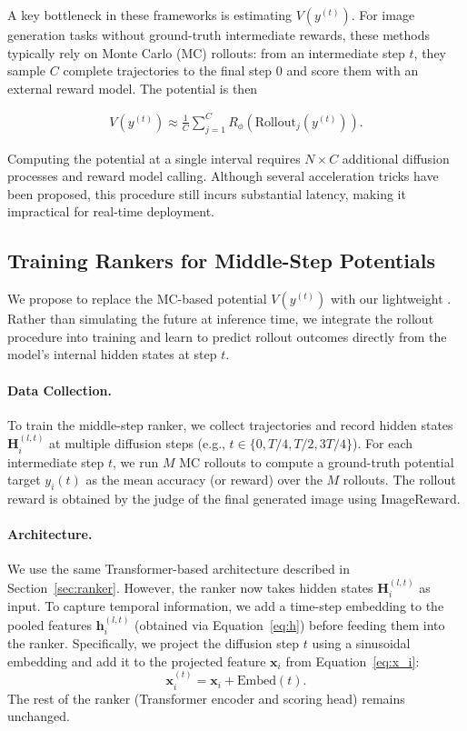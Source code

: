 \documentclass{article}
\newcommand{\method}{\text{Diffusion Ranker}\xspace}
\begin{document}
A key bottleneck in these frameworks is estimating $V(y^{(t)})$. For image generation tasks without ground-truth intermediate rewards, these methods typically rely on Monte Carlo (MC) rollouts: from an intermediate step $t$, they sample $C$ complete trajectories to the final step $0$ and score them with an external reward model. The potential is then

\begin{align}
    V(y^{(t)}) \approx \frac{1}{C} \sum_{j=1}^{C} R_{\phi}(\text{Rollout}_{j}(y^{(t)})).
    \label{eq:V}
\end{align}

Computing the potential at a single interval requires $N \times C$ additional diffusion processes and reward model calling. Although several acceleration tricks have been proposed, this procedure still incurs substantial latency, making it impractical for real-time deployment.

\subsection{Training Rankers for Middle-Step Potentials}

We propose to replace the MC-based potential $V(y^{(t)})$ with our lightweight \method. Rather than simulating the future at inference time, we integrate the rollout procedure into training and learn to predict rollout outcomes directly from the model's internal hidden states at step $t$.

\paragraph{Data Collection.}
To train the middle-step ranker, we collect trajectories and record hidden states $\mathbf{H}_i^{(l,t)}$ at multiple diffusion steps (e.g., $t \in \{0, T/4, T/2, 3T/4\}$). For each intermediate step $t$, we run $M$ MC rollouts to compute a ground-truth potential target $y_i(t)$ as the mean accuracy (or reward) over the $M$ rollouts. The rollout reward is obtained by the judge of the final generated image using ImageReward.

\paragraph{Architecture.}
We use the same Transformer-based architecture described in Section~\ref{sec:ranker}. However, the ranker now takes hidden states $\mathbf{H}_i^{(l,t)}$ as input. To capture temporal information, we add a time-step embedding to the pooled features $\mathbf{h}_i^{(l,t)}$ (obtained via Equation~\ref{eq:h}) before feeding them into the ranker. Specifically, we project the diffusion step $t$ using a sinusoidal embedding and add it to the projected feature $\mathbf{x}_i$ from Equation~\ref{eq:x_i}:
\begin{equation}
    \mathbf{x}_i^{(t)} = \mathbf{x}_i + \text{Embed}(t).
\end{equation}
The rest of the ranker (Transformer encoder and scoring head) remains unchanged.
\end{document}

